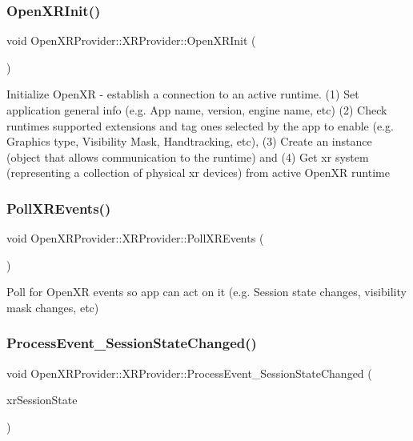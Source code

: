 \subsubsection{\texorpdfstring{OpenXRInit()}{OpenXRInit()}}
{\footnotesize\ttfamily void Open\+X\+R\+Provider\+::\+X\+R\+Provider\+::\+Open\+X\+R\+Init (\begin{DoxyParamCaption}{ }\end{DoxyParamCaption})\hspace{0.3cm}{\ttfamily [private]}}

Initialize Open\+XR -\/ establish a connection to an active runtime. (1) Set application general info (e.\+g. App name, version, engine name, etc) (2) Check runtime\textquotesingle{}s supported extensions and tag ones selected by the app to enable (e.\+g. Graphics type, Visibility Mask, Handtracking, etc), (3) Create an instance (object that allows communication to the runtime) and (4) Get xr system (representing a collection of physical xr devices) from active Open\+XR runtime \mbox{\label{class_open_x_r_provider_1_1_x_r_provider_a1eb2fce148d5ab2d3399235c23131808}} 
\subsubsection{\texorpdfstring{PollXREvents()}{PollXREvents()}}
{\footnotesize\ttfamily void Open\+X\+R\+Provider\+::\+X\+R\+Provider\+::\+Poll\+X\+R\+Events (\begin{DoxyParamCaption}{ }\end{DoxyParamCaption})}



Poll for Open\+XR events so app can act on it (e.\+g. Session state changes, visibility mask changes, etc) 

\mbox{\label{class_open_x_r_provider_1_1_x_r_provider_ad8bb9f4fcd7a16440f89d3ad0b54b17b}} 
\subsubsection{\texorpdfstring{ProcessEvent\_SessionStateChanged()}{ProcessEvent\_SessionStateChanged()}}
{\footnotesize\ttfamily void Open\+X\+R\+Provider\+::\+X\+R\+Provider\+::\+Process\+Event\+\_\+\+Session\+State\+Changed (\begin{DoxyParamCaption}\item[{const Xr\+Session\+State}]{xr\+Session\+State }\end{DoxyParamCaption})\hspace{0.3cm}{\ttfamily [private]}}

